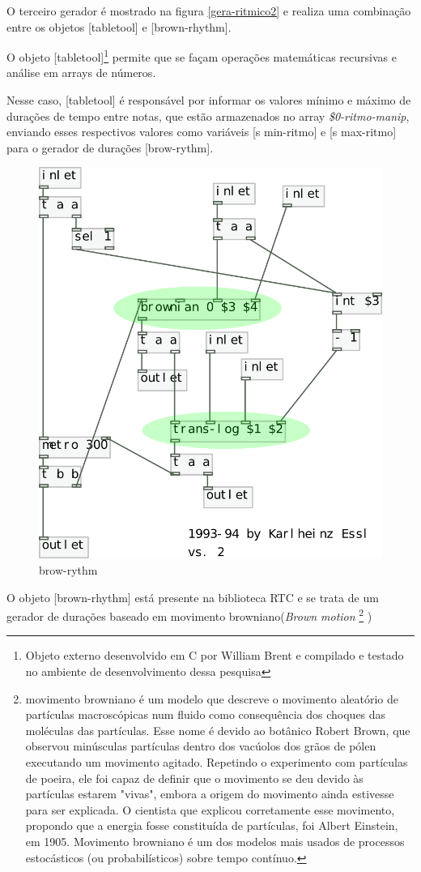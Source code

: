 \documentclass{ppgmus}
\begin{document}
O terceiro gerador é mostrado na figura \ref{gera-ritmico2} e
realiza uma combinação entre os objetos [tabletool] e [brown-rhythm].

O objeto [tabletool]\footnote{Objeto externo desenvolvido em C
por William Brent e compilado e testado no ambiente de desenvolvimento
dessa pesquisa} permite que se façam operações matemáticas
recursivas e análise em arrays de números. 

Nesse caso, [tabletool] é responsável por informar os valores
mínimo e máximo de durações de tempo entre notas, que estão
armazenados no array \textit{\$0-ritmo-manip}, enviando
esses respectivos valores como variáveis [s min-ritmo] e 
[s max-ritmo] para o gerador de durações [brow-rythm].


 \begin{figure}
\includegraphics[scale=.6]{brown-rythm}
\caption{brow-rythm}
\label{brown-rythm}
\end{figure}  

O objeto [brown-rhythm] está presente na biblioteca RTC e se trata de
um gerador de durações baseado em movimento browniano(\textit{Brown motion}
\footnote{movimento browniano é um modelo que descreve o movimento aleatório 
de partículas macroscópicas num fluido como consequência dos choques das 
moléculas das partículas. Esse nome é devido ao botânico Robert
Brown, que observou minúsculas partículas dentro dos vacúolos dos grãos de 
pólen executando um movimento agitado. Repetindo o experimento com partículas de poeira, 
ele foi capaz de definir que o movimento se deu devido às partículas estarem "vivas", 
embora a origem do movimento ainda estivesse para ser explicada.
O cientista que explicou corretamente esse movimento, propondo que a energia fosse 
constituída de partículas, foi Albert Einstein, em 1905.
Movimento browniano é um dos modelos mais usados de processos estocásticos
(ou probabilísticos) sobre tempo contínuo.} )
\end{document}
